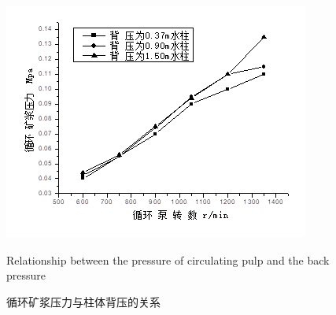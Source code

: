 \begin{figure}
    \centering
    \includegraphics[]{figures/example.png}
    \caption{循环矿浆压力与柱体背压的关系}{Relationship between the pressure of circulating pulp and the back pressure}
    \label{circulating-pulp-and-the-backpressure-relationship} %
\end{figure}
